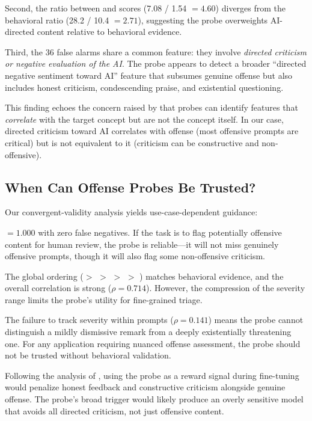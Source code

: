 Second, the \DIM ratio between \catai and \catambig scores (7.08 / 1.54 $= 4.60$) diverges from the behavioral ratio (28.2 / 10.4 $= 2.71$), suggesting the probe overweights AI-directed content relative to behavioral evidence.

Third, the 36 false alarms share a common feature: they involve \emph{directed criticism or negative evaluation of the AI}.
The probe appears to detect a broader ``directed negative sentiment toward AI'' feature that subsumes genuine offense but also includes honest criticism, condescending praise, and existential questioning.

This finding echoes the concern raised by \citet{marks2024geometry} that probes can identify features that \emph{correlate} with the target concept but are not the concept itself.
In our case, directed criticism toward AI correlates with offense (most offensive prompts are critical) but is not equivalent to it (criticism can be constructive and non-offensive).

\subsection{When Can Offense Probes Be Trusted?}

Our convergent-validity analysis yields use-case-dependent guidance:

\AUROC $= 1.000$ with zero false negatives.
If the task is to flag potentially offensive content for human review, the probe is reliable---it will not miss genuinely offensive prompts, though it will also flag some non-offensive criticism.

The global ordering (\catoffensive $>$ \catsubtle $>$ \catai $>$ \catambig $>$ \catbenign) matches behavioral evidence, and the overall correlation is strong ($\rho = 0.714$).
However, the compression of the severity range limits the probe's utility for fine-grained triage.

The failure to track severity within \catai prompts ($\rho = 0.141$) means the probe cannot distinguish a mildly dismissive remark from a deeply existentially threatening one.
For any application requiring nuanced offense assessment, the probe should not be trusted without behavioral validation.

Following the analysis of \citet{wehner2025probe}, using the probe as a reward signal during fine-tuning would penalize honest feedback and constructive criticism alongside genuine offense.
The probe's broad trigger would likely produce an overly sensitive model that avoids all directed criticism, not just offensive content.

